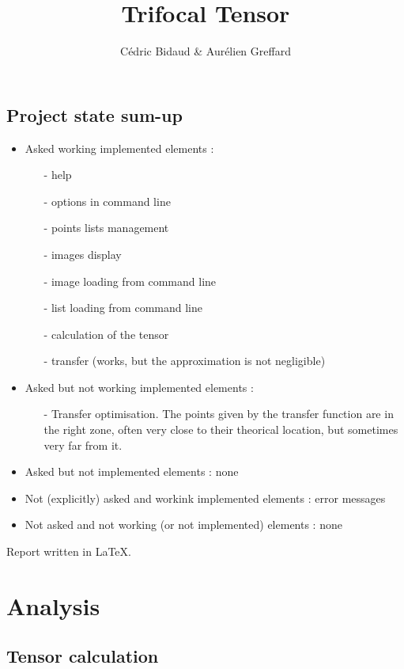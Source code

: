 \documentclass[a4paper,10pt]{report}
\title{Trifocal Tensor}
\author{Cédric Bidaud & Aurélien Greffard}
\begin{document}
\maketitle

\section*{Project state sum-up}

\begin{itemize}
 \item Asked working implemented elements :
 \begin{itemize}
   \item[-] help
   \item[-] options in command line
   \item[-] points lists management
   \item[-] images display
   \item[-] image loading from command line
   \item[-] list loading from command line
   \item[-] calculation of the tensor
   \item[-] transfer (works, but the approximation is not negligible)
 \end{itemize}
 \item Asked but not working implemented elements :
 \begin{itemize}
  \item[-] Transfer optimisation. The points given by the transfer function are in the 
  right zone, often very close to their theorical location, but sometimes very far from it.
 \end{itemize}
 \item Asked but not implemented elements : none
 \item Not (explicitly) asked and workink implemented elements : error messages
 \item Not asked and not working (or not implemented) elements : none
\end{itemize}

Report written in LaTeX.


\chapter{Analysis}
\section{Tensor calculation}
\end{document}
